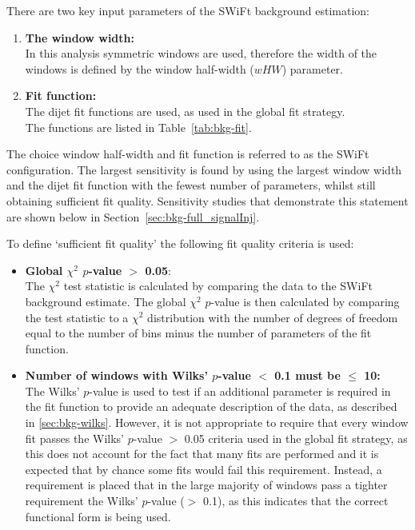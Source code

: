 There are two key input parameters of the SWiFt background estimation:
\begin{enumerate}[leftmargin=*]
\item \textbf{The window width:}\\
  In this analysis symmetric windows are used, therefore the width of the windows is defined by the window half-width ($wHW$) parameter.\vspace{0.5em}
\item \textbf{Fit function:}\\
  The dijet fit functions are used, as used in the global fit strategy. \\
  The functions are listed in Table~\ref{tab:bkg-fit}.
\end{enumerate}
The choice window half-width and fit function is referred to as the SWiFt configuration.
The largest sensitivity is found by using the largest window width and the dijet fit function with the fewest number of parameters, whilst still obtaining sufficient fit quality.
Sensitivity studies that demonstrate this statement are shown below in Section~\ref{sec:bkg-full_signalInj}.

\noindent
To define `sufficient fit quality' the following fit quality criteria is used:
\begin{itemize}[leftmargin=*]
  
\item \textbf{Global $\chi^{2}$ \mbox{$p$-value} $>$ 0.05}:\\
  The $\chi^{2}$ test statistic is calculated by comparing the data to the SWiFt background estimate.
  The global $\chi^{2}$ \mbox{$p$-value} is then calculated by comparing the test statistic
  to a $\chi^{2}$ distribution with the number of degrees of freedom equal to the number of bins
  minus the number of parameters of the fit function.\vspace{0.5em}
\item \textbf{Number of windows with Wilks' \mbox{$p$-value} $<$ 0.1 must be $\leq$ 10:}\\
  The Wilks' \mbox{$p$-value} is used to test if an additional parameter is required in the fit function
  to provide an adequate description of the data, as described in \ref{sec:bkg-wilks}. 
  However, it is not appropriate to require that every window fit passes the Wilks' $p$-value $>$ 0.05 criteria used in the global fit strategy,
  as this does not account for the fact that many fits are performed and it is expected that by chance some fits would fail this requirement.
  Instead, a requirement is placed that in the large majority of windows pass a tighter requirement the Wilks' $p$-value ($>$ 0.1),
  as this indicates that the correct functional form is being used.
\end{itemize}


